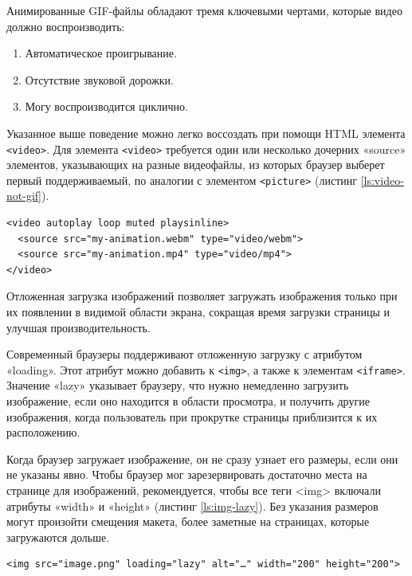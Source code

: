 Анимированные GIF-файлы обладают тремя ключевыми чертами, которые видео должно воспроизводить:

\begin{enumerate} 
  \item Автоматическое проигрывание.
  
  \item Отсутствие звуковой дорожки.

  \item Могу воспроизводится циклично.
\end{enumerate}

Указанное выше поведение можно легко воссоздать при помощи HTML элемента \verb|<video>|. Для элемента \verb|<video>| требуется один или несколько дочерних «source» элементов, указывающих на разные видеофайлы, из которых браузер выберет первый поддерживаемый,  по аналогии с элементом \verb|<picture>| (листинг \ref{ls:video-not-gif}).

\begin{lstlisting}[caption={Использование элемента <video> вместо GIF изображений}, label={ls:video-not-gif}]
<video autoplay loop muted playsinline>
  <source src="my-animation.webm" type="video/webm">
  <source src="my-animation.mp4" type="video/mp4">
</video>
\end{lstlisting}

Отложенная загрузка изображений позволяет загружать изображения только при их появлении в видимой области экрана, сокращая время загрузки страницы и улучшая производительность.

Современный браузеры поддерживают отложенную загрузку с атрибутом «loading». Этот атрибут можно добавить к \verb|<img>|, а также к элементам \verb|<iframe>|. Значение «lazy» указывает браузеру, что нужно немедленно загрузить изображение, если оно находится в области просмотра, и получить другие изображения, когда пользователь при прокрутке страницы приблизится к их расположению.

Когда браузер загружает изображение, он не сразу узнает его размеры, если они не указаны явно. Чтобы браузер мог зарезервировать достаточно места на странице для изображений, рекомендуется, чтобы все теги <img> включали атрибуты «width» и «height» (листинг \ref{ls:img-lazy}). Без указания размеров могут произойти смещения макета, более заметные на страницах, которые загружаются дольше.

\begin{lstlisting}[caption={Использование атрибута loading для отложенной загрузки изображений}, label={ls:img-lazy}]
<img src="image.png" loading="lazy" alt="…" width="200" height="200">
\end{lstlisting}


